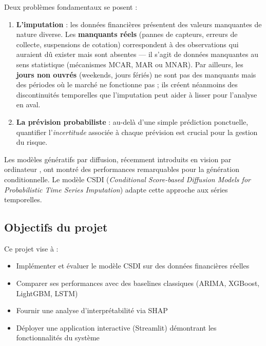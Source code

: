 \documentclass[12pt,a4paper]{article}
\begin{document}
Deux probl\`emes fondamentaux se posent :
\begin{enumerate}
    \item \textbf{L'imputation} : les donn\'ees financi\`eres pr\'esentent des valeurs manquantes de nature diverse. Les \textbf{manquants r\'eels} (pannes de capteurs, erreurs de collecte, suspensions de cotation) correspondent \`a des observations qui auraient d\^u exister mais sont absentes --- il s'agit de donn\'ees manquantes au sens statistique (m\'ecanismes MCAR, MAR ou MNAR). Par ailleurs, les \textbf{jours non ouvr\'es} (weekends, jours f\'eri\'es) ne sont pas des manquants mais des p\'eriodes o\`u le march\'e ne fonctionne pas ; ils cr\'eent n\'eanmoins des discontinuit\'es temporelles que l'imputation peut aider \`a lisser pour l'analyse en aval.
    \item \textbf{La pr\'evision probabiliste} : au-del\`a d'une simple pr\'ediction ponctuelle, quantifier l'\textit{incertitude} associ\'ee \`a chaque pr\'evision est crucial pour la gestion du risque.
\end{enumerate}

Les mod\`eles g\'en\'eratifs par diffusion, r\'ecemment introduits en vision par ordinateur \cite{ho2020}, ont montr\'e des performances remarquables pour la g\'en\'eration conditionnelle. Le mod\`ele CSDI (\textit{Conditional Score-based Diffusion Models for Probabilistic Time Series Imputation}) \cite{tashiro2021} adapte cette approche aux s\'eries temporelles.

\subsection{Objectifs du projet}

Ce projet vise \`a :
\begin{itemize}
    \item Impl\'ementer et \'evaluer le mod\`ele CSDI sur des donn\'ees financi\`eres r\'eelles
    \item Comparer ses performances avec des baselines classiques (ARIMA, XGBoost, LightGBM, LSTM)
    \item Fournir une analyse d'interpr\'etabilit\'e via SHAP
    \item D\'eployer une application interactive (Streamlit) d\'emontrant les fonctionnalit\'es du syst\`eme
\end{itemize}

\end{document}
